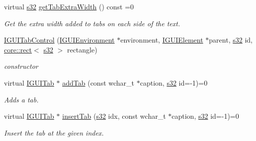 \begin{DoxyCompactItemize}
virtual \hyperlink{namespaceirr_ac66849b7a6ed16e30ebede579f9b47c6}{s32} \hyperlink{classirr_1_1gui_1_1IGUITabControl_afaeab7a998a34ab5e8398930276ab3bd}{get\+Tab\+Extra\+Width} () const =0
\begin{DoxyCompactList}\small\item\em Get the extra width added to tabs on each side of the text. \end{DoxyCompactList}\item 
\mbox{\label{classirr_1_1gui_1_1IGUITabControl_a01e66ddc01de0a0185407e4bd839ed31}} 
\hyperlink{classirr_1_1gui_1_1IGUITabControl_a01e66ddc01de0a0185407e4bd839ed31}{I\+G\+U\+I\+Tab\+Control} (\hyperlink{classirr_1_1gui_1_1IGUIEnvironment}{I\+G\+U\+I\+Environment} $\ast$environment, \hyperlink{classirr_1_1gui_1_1IGUIElement}{I\+G\+U\+I\+Element} $\ast$parent, \hyperlink{namespaceirr_ac66849b7a6ed16e30ebede579f9b47c6}{s32} id, \hyperlink{classirr_1_1core_1_1rect}{core\+::rect}$<$ \hyperlink{namespaceirr_ac66849b7a6ed16e30ebede579f9b47c6}{s32} $>$ rectangle)
\begin{DoxyCompactList}\small\item\em constructor \end{DoxyCompactList}\item 
\mbox{\label{classirr_1_1gui_1_1IGUITabControl_a4b1a55fd79785abc4f5bcb05f8637a42}} 
virtual \hyperlink{classirr_1_1gui_1_1IGUITab}{I\+G\+U\+I\+Tab} $\ast$ \hyperlink{classirr_1_1gui_1_1IGUITabControl_a4b1a55fd79785abc4f5bcb05f8637a42}{add\+Tab} (const wchar\+\_\+t $\ast$caption, \hyperlink{namespaceirr_ac66849b7a6ed16e30ebede579f9b47c6}{s32} id=-\/1)=0
\begin{DoxyCompactList}\small\item\em Adds a tab. \end{DoxyCompactList}\item 
virtual \hyperlink{classirr_1_1gui_1_1IGUITab}{I\+G\+U\+I\+Tab} $\ast$ \hyperlink{classirr_1_1gui_1_1IGUITabControl_a7ee37817344a547a240b751e3386b85b}{insert\+Tab} (\hyperlink{namespaceirr_ac66849b7a6ed16e30ebede579f9b47c6}{s32} idx, const wchar\+\_\+t $\ast$caption, \hyperlink{namespaceirr_ac66849b7a6ed16e30ebede579f9b47c6}{s32} id=-\/1)=0
\begin{DoxyCompactList}\small\item\em Insert the tab at the given index. \end{DoxyCompactList}\item 

\end{DoxyCompactItemize}
